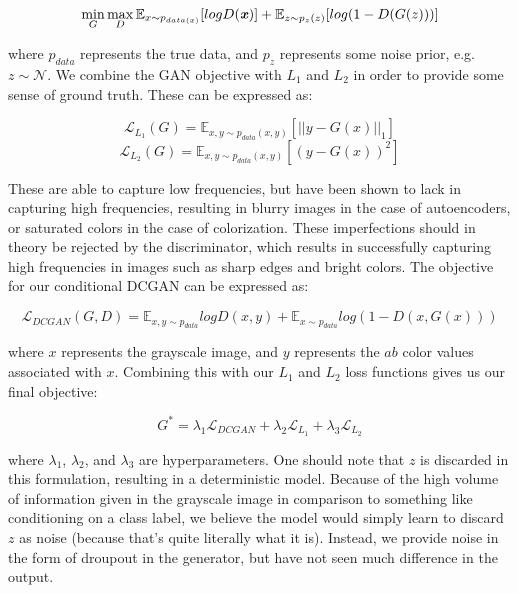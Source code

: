 \documentclass[10pt]{article}
\begin{document}
\[\min\limits_{G}\max\limits_{D} \mathbb{E}_{x \sim p_{data(x)}} [logD(\textbf{\textit{x}})] + \mathbb{E}_{z \sim p_z(z)}[log(1 - D(G(z)))]\]

\noindent where $p_{data}$ represents the true data, and $p_z$ represents some noise prior, e.g.
$z \sim \mathcal{N}$. 
We combine the GAN objective with $L_1$ and $L_2$ in order to provide some sense of ground truth. These can
be expressed as:

\[ \mathcal{L}_{L_1}(G) = \mathbb{E}_{x,y\sim p_{data}(x,y)}[||y-G(x)||_1] \]
\[ \mathcal{L}_{L_2}(G) = \mathbb{E}_{x,y\sim p_{data}(x,y)}[(y-G(x))^2] \]


\noindent These are able to capture low frequencies, but have been shown to lack in capturing high
frequencies, resulting in blurry images in the case of autoencoders, or saturated colors in the case of
colorization. These imperfections should in theory be rejected by the discriminator, which results in
successfully capturing high frequencies in images such as sharp edges and bright colors. The objective
for our conditional DCGAN can be expressed as:

\[ \mathcal{L}_{DCGAN}(G,D) = \mathbb{E}_{x,y \sim p_{data}} log D(x,y) + \mathbb{E}_{x \sim p_{data}}
log (1-D(x, G(x)))\]

\noindent where $x$ represents the grayscale image, and $y$ represents the $ab$ color values associated with
$x$. Combining this with our $L_1$ and $L_2$ loss functions gives us our final objective:

\[ G^* = \lambda_1 \mathcal{L}_{DCGAN} + \lambda_2 \mathcal{L}_{L_1} + \lambda_3 \mathcal{L}_{L_2} \]


\noindent where $\lambda_1$, $\lambda_2$, and $\lambda_3$ are hyperparameters. One should note that $z$
is discarded in this formulation, resulting in a deterministic model.
Because of the high volume of information given in the grayscale image in comparison to something like
conditioning on a class label, we believe the model would simply learn to discard $z$ as noise
(because that's quite literally what it is). Instead, we provide noise in the form of droupout in the
generator, but have not seen much difference in the output.
\end{document}
